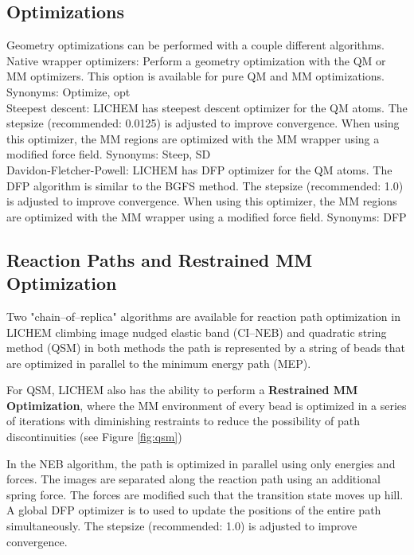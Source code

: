 \documentclass[12pt]{report}
\begin{document}
\subsection{Optimizations}

Geometry optimizations can be performed with a couple different algorithms.
\\

Native wrapper optimizers: Perform a geometry optimization with the QM or
MM optimizers.
This option is available for pure QM and MM optimizations.
Synonyms: Optimize, opt \\

Steepest descent: LICHEM has steepest descent
optimizer \textcolor{red}{\cite{Press2007}}
for the QM
atoms.
The stepsize (recommended: 0.0125) is adjusted to improve convergence.
When using this optimizer, the MM regions are optimized with the MM wrapper
using a modified force field.
Synonyms: Steep, SD \\

Davidon-Fletcher-Powell: LICHEM has DFP
optimizer \textcolor{red}{\cite{Press2007,Sheppard2008_DFP}}
for the QM atoms.
The DFP algorithm is similar to the BGFS method.
The stepsize (recommended: 1.0) is adjusted to improve convergence.
When using this optimizer, the MM regions are optimized with the MM wrapper
using a modified force field.
Synonyms: DFP

\subsection{Reaction Paths and Restrained MM Optimization}

Two "chain--of--replica" algorithms are available
for reaction path optimization in LICHEM
climbing image nudged elastic band (CI--NEB)
\textcolor{red}{\cite{NEB2000_A,NEB2000_B}}
and quadratic string method (QSM) \cite{Burger2006}
in both methods the path is represented by a string of beads
that are optimized in parallel to the minimum energy path (MEP).

For QSM, LICHEM also has the ability to perform a \textbf{Restrained
MM Optimization}, where the MM environment of every bead is
optimized in a series of iterations with diminishing restraints to
reduce the possibility of path discontinuities (see Figure \ref{fig:qsm})
\cite{Xie2004,AndresCisneros2009}

In the NEB algorithm, the path is optimized in parallel using only energies
and forces. The images are separated along the reaction path using
an additional spring force.  The forces
are modified such that the transition state moves up hill.
A global DFP optimizer is to used to update the positions of the entire path
simultaneously.
The stepsize (recommended: 1.0) is adjusted to improve convergence.
\end{document}
